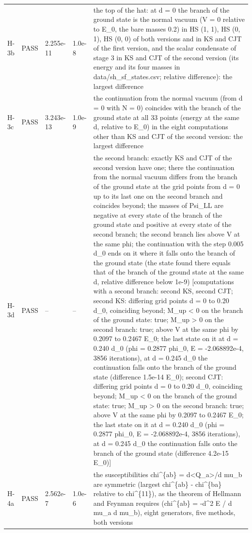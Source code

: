 \documentclass[aps,prd,onecolumn,superscriptaddress,nofootinbib,floatfix,longbibliography]{revtex4-2}
\begin{document}
\begin{longtable}{p{}p{}p{}p{}p{}}
H-3b & PASS & 2.255e-11 & 1.0e-8 & the top of the hat: at d = 0 the branch of the ground state is the normal vacuum (V = 0 relative to \textbar{}E\_0\textbar{}, the bare masses 0.2) in HS (1, 1), HS (0, 1), HS (0, 0) of both versions and in KS and CJT of the first version, and the scalar condensate of stage 3 in KS and CJT of the second version (its energy and its four masses in data/sh\_sf\_states.csv; relative difference): the largest difference \\
H-3c & PASS & 3.243e-13 & 1.0e-9 & the continuation from the normal vacuum (from d = 0 with N = 0) coincides with the branch of the ground state at all 33 points (energy at the same d, relative to \textbar{}E\_0\textbar{}) in the eight computations other than KS and CJT of the second version: the largest difference \\
H-3d & PASS & -- & -- & the second branch: exactly KS and CJT of the second version have one; there the continuation from the normal vacuum differs from the branch of the ground state at the grid points from d = 0 up to its last one on the second branch and coincides beyond; the masses of Psi\_LL are negative at every state of the branch of the ground state and positive at every state of the second branch; the second branch lies above V at the same phi; the continuation with the step 0.005 d\_0 ends on it where it falls onto the branch of the ground state (the state found there equals that of the branch of the ground state at the same d, relative difference below 1e-9) [computations with a second branch: second KS, second CJT; second KS: differing grid points d = 0 to 0.20 d\_0, coinciding beyond; M\_up \textless{} 0 on the branch of the ground state: true; M\_up \textgreater{} 0 on the second branch: true; above V at the same phi by 0.2097 to 0.2467 \textbar{}E\_0\textbar{}; the last state on it at d = 0.240 d\_0 (phi = 0.2877 phi\_0, E = -2.068892e-4, 3856 iterations), at d = 0.245 d\_0 the continuation falls onto the branch of the ground state (difference 1.5e-14 \textbar{}E\_0\textbar{}); second CJT: differing grid points d = 0 to 0.20 d\_0, coinciding beyond; M\_up \textless{} 0 on the branch of the ground state: true; M\_up \textgreater{} 0 on the second branch: true; above V at the same phi by 0.2097 to 0.2467 \textbar{}E\_0\textbar{}; the last state on it at d = 0.240 d\_0 (phi = 0.2877 phi\_0, E = -2.068892e-4, 3856 iterations), at d = 0.245 d\_0 the continuation falls onto the branch of the ground state (difference 4.2e-15 \textbar{}E\_0\textbar{})] \\
H-4a & PASS & 2.562e-7 & 1.0e-6 & the susceptibilities chi\textasciicircum{}\{ab\} = d\textless{}Q\_a\textgreater{}/d mu\_b are symmetric (largest \textbar{}chi\textasciicircum{}\{ab\} - chi\textasciicircum{}\{ba\}\textbar{} relative to chi\textasciicircum{}\{11\}), as the theorem of Hellmann and Feynman requires (chi\textasciicircum{}\{ab\} = -d\textasciicircum{}2 E / d mu\_a d mu\_b), eight generators, five methods, both versions \\

\end{longtable}
\end{document}
